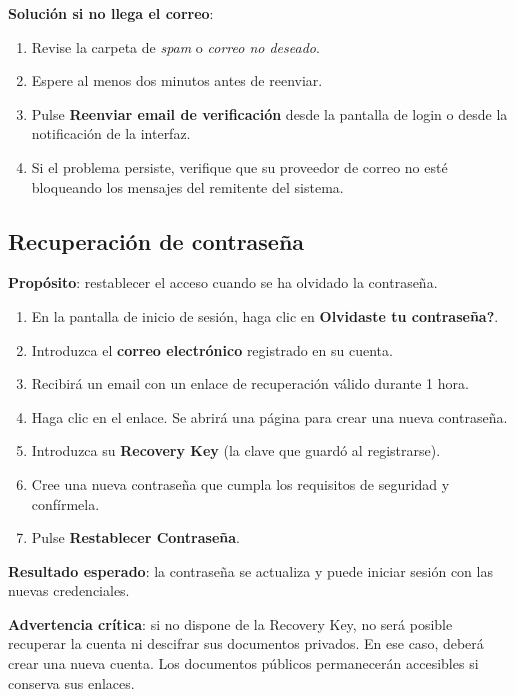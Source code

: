 \documentclass[11pt, a4paper]{article}
\begin{document}
\textbf{Soluci\'{o}n si no llega el correo}:
\begin{enumerate}
    \item Revise la carpeta de \textit{spam} o \textit{correo no deseado}.
    \item Espere al menos dos minutos antes de reenviar.
    \item Pulse \textbf{Reenviar email de verificaci\'{o}n} desde la pantalla de login o desde la notificaci\'{o}n de la interfaz.
    \item Si el problema persiste, verifique que su proveedor de correo no est\'{e} bloqueando los mensajes del remitente del sistema.
\end{enumerate}

\subsection{Recuperaci\'{o}n de contrase\~{n}a}

\textbf{Prop\'{o}sito}: restablecer el acceso cuando se ha olvidado la contrase\~{n}a.

\begin{enumerate}
    \item En la pantalla de inicio de sesi\'{o}n, haga clic en \textbf{Olvidaste tu contrase\~{n}a?}.
    \item Introduzca el \textbf{correo electr\'{o}nico} registrado en su cuenta.
    \item Recibir\'{a} un email con un enlace de recuperaci\'{o}n v\'{a}lido durante 1 hora.
    \item Haga clic en el enlace. Se abrir\'{a} una p\'{a}gina para crear una nueva contrase\~{n}a.
    \item Introduzca su \textbf{Recovery Key} (la clave que guard\'{o} al registrarse).
    \item Cree una nueva contrase\~{n}a que cumpla los requisitos de seguridad y conf\'{i}rmela.
    \item Pulse \textbf{Restablecer Contrase\~{n}a}.
\end{enumerate}

\textbf{Resultado esperado}: la contrase\~{n}a se actualiza y puede iniciar sesi\'{o}n con las nuevas credenciales.

\textbf{Advertencia cr\'{i}tica}: si no dispone de la Recovery Key, no ser\'{a} posible recuperar la cuenta ni descifrar sus documentos privados. En ese caso, deber\'{a} crear una nueva cuenta. Los documentos p\'{u}blicos permanecer\'{a}n accesibles si conserva sus enlaces.
\end{document}
